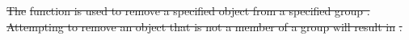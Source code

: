 \documentclass[12pt]{report} %
\providecommand{\DIFdeltex}[1]{{\protect\color{red}\sout{#1}}}                      %
\providecommand{\DIFdelbegin}{} %
\providecommand{\DIFdel}[1]{\texorpdfstring{\DIFdeltex{#1}}{}} %
\newcommand{\DIFscaledelfig}{0.5}
\newlength{\DIFdelgraphicswidth} %
\newlength{\DIFdelgraphicsheight} %
\newcommand{\DIFdelincludegraphics}[2][]{%
\sbox{\DIFdelgraphicsbox}{\DIFOincludegraphics[#1]{#2}}%
\settoboxwidth{\DIFdelgraphicswidth}{\DIFdelgraphicsbox} %
\settoboxtotalheight{\DIFdelgraphicsheight}{\DIFdelgraphicsbox} %
\scalebox{\DIFscaledelfig}{%
\parbox[b]{\DIFdelgraphicswidth}{\usebox{\DIFdelgraphicsbox}\\[-\baselineskip] \rule{\DIFdelgraphicswidth}{0em}}\llap{\resizebox{\DIFdelgraphicswidth}{\DIFdelgraphicsheight}{%
\setlength{\unitlength}{\DIFdelgraphicswidth}%
\begin{picture}(1,1)%
\thicklines\linethickness{2pt} %
{\color[rgb]{1,0,0}\put(0,0){\framebox(1,1){}}}%
{\color[rgb]{1,0,0}\put(0,0){\line( 1,1){1}}}%
{\color[rgb]{1,0,0}\put(0,1){\line(1,-1){1}}}%
\end{picture}%
}\hspace*{3pt}}} %
} %
\DeclareRobustCommand{\DIFdelbegin}{\DIFOdelbegin \let\includegraphics\DIFdelincludegraphics} %
\begin{document}
\DIFdelbegin %

\DIFdel{The }%
\DIFdel{function is used to remove a specified object from a specified group .
Attempting to remove an object that is not a member of a group will result in }%
\DIFdel{.
}%

\end{document}
